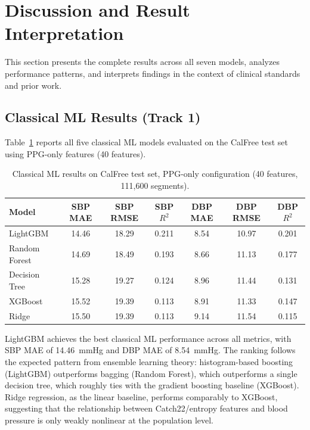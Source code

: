 \documentclass[11pt]{article}
\begin{document}
\section{Discussion and Result Interpretation}

This section presents the complete results across all seven models, analyzes performance patterns, and interprets findings in the context of clinical standards and prior work.

\subsection{Classical ML Results (Track 1)}

Table~\ref{tab:classical_ppg} reports all five classical ML models evaluated on the CalFree test set using PPG-only features (40 features).

\begin{table}[ht!]
\centering
\begin{tabular}{@{}lcccccc@{}}
\toprule
\textbf{Model} & \textbf{SBP MAE} & \textbf{SBP RMSE} & \textbf{SBP $R^2$} & \textbf{DBP MAE} & \textbf{DBP RMSE} & \textbf{DBP $R^2$} \\
\midrule
LightGBM     & 14.46 & 18.29 & 0.211 & 8.54  & 10.97 & 0.201 \\
Random Forest & 14.69 & 18.49 & 0.193 & 8.66  & 11.13 & 0.177 \\
Decision Tree & 15.28 & 19.27 & 0.124 & 8.96  & 11.44 & 0.131 \\
XGBoost      & 15.52 & 19.39 & 0.113 & 8.91  & 11.33 & 0.147 \\
Ridge        & 15.50 & 19.39 & 0.113 & 9.14  & 11.54 & 0.115 \\
\bottomrule
\end{tabular}
\caption{Classical ML results on CalFree test set, PPG-only configuration (40 features, 111,600 segments).}
\label{tab:classical_ppg}
\end{table}

LightGBM achieves the best classical ML performance across all metrics, with SBP MAE of 14.46~mmHg and DBP MAE of 8.54~mmHg. The ranking follows the expected pattern from ensemble learning theory: histogram-based boosting (LightGBM) outperforms bagging (Random Forest), which outperforms a single decision tree, which roughly ties with the gradient boosting baseline (XGBoost). Ridge regression, as the linear baseline, performs comparably to XGBoost, suggesting that the relationship between Catch22/entropy features and blood pressure is only weakly nonlinear at the population level.
\end{document}

